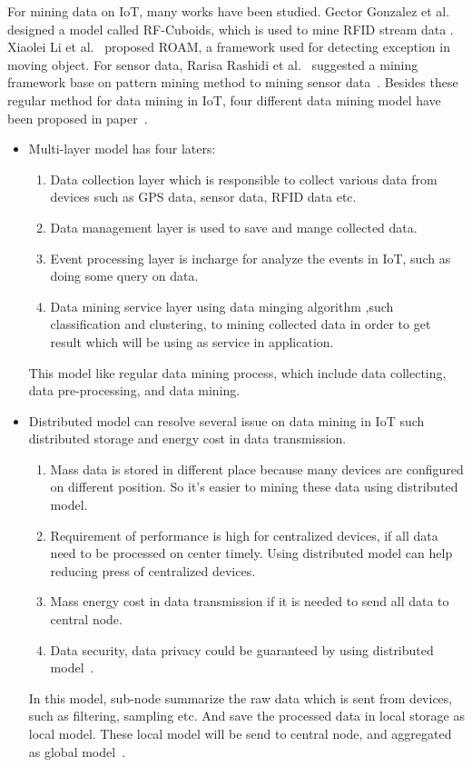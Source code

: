 \documentclass{report}
\begin{document}
For mining data on IoT, many works have been studied. Gector Gonzalez et al.~\cite{gonzalez2006warehousing} designed a model called RF-Cuboids, which is used to mine RFID stream data . Xiaolei Li et al.~\cite{li2007roam} proposed ROAM, a framework used for  detecting exception in moving object. For sensor data, Rarisa Rashidi et al.~\cite{rashidi2010adaptive} suggested a mining framework base on pattern mining method to mining sensor data~\cite{bin2010research}. Besides these regular method for data mining in IoT, four different data mining model have been proposed in paper~\cite{bin2010research}.
\begin{itemize}
    \item Multi-layer model has four laters\cite{bin2010research}: 
    \begin{enumerate}
        \item Data collection layer which is responsible to collect various data from devices such as GPS data, sensor data, RFID data etc. 
        
        \item Data management layer is used to save and mange collected data.
        \item Event processing layer is incharge for analyze the events in IoT, such as doing some query on data.
        \item Data mining service layer using data minging algorithm ,such classification and clustering, to mining collected data in order to get result which will be using as service in application.
    \end{enumerate}
    This model like regular data mining process, which include data collecting, data pre-processing, and data mining.
    
    \item Distributed model can resolve several issue on data mining in IoT such distributed storage and energy cost in data transmission.
    \begin{enumerate}
        \item Mass data is stored in different place because many devices are configured on different position. So it's easier to mining these data using distributed model.
        \item Requirement of performance is high for centralized devices, if all data need to be processed on center timely. Using distributed model can help reducing press of centralized devices.
        \item Mass energy cost in data transmission if it is needed to send all data to central node.
        \item Data security, data privacy could be guaranteed by using distributed model~\cite{bin2010research}.
    \end{enumerate}
    In this model, sub-node summarize the raw data which is sent from devices, such as filtering, sampling etc. And save the processed data in local storage as local model. These local model will be send to central node, and aggregated as global model~\cite{bin2010research}.
    

\end{itemize}
\end{document}
